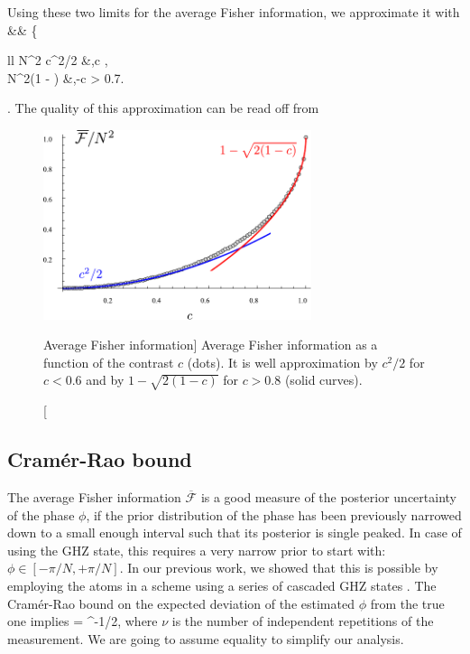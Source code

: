Using these two limits for the average Fisher information, we approximate it
with
\bal
\label{eq:overline_F}
	&\approx&
	\left\{
	\begin{array}{ll}
		N^2 c^2/2 &,\quad {}\quad c , \\
		N^2\left(1 - \right) &,\quad {}-c > 0.7.
	\end{array} 
	\right.
\eal
The quality of this approximation can be read off from 
\begin{figure}[h]
\centering
\includegraphics[width=0.7\textwidth]{./figs_Komar2015/Fisher_inf.pdf}
\caption
[Average Fisher information]
{
\label{fig:Fisher_inf}
Average Fisher information as a function of the contrast
$c$ (dots). It is well approximation by $c^2/2$ for $c < 0.6$ and by
$1-\sqrt{2(1-c)}$ for $c > 0.8$ (solid curves).} 
\end{figure}

\subsection{Cram\'{e}r-Rao bound}

The average Fisher information $\overline{\mathcal{F}}$ is a good measure of the
posterior uncertainty of the phase $\phi$, if the prior distribution of the
phase has been previously narrowed down to a small enough interval such that
its posterior is single peaked.
 In case of using the GHZ state, this requires a
very narrow prior to start with: $\phi \in [-\pi/N, +\pi/N]$. In our previous
work, we showed that this is possible by employing the atoms in a scheme using a
series of cascaded GHZ states \cite{Kessler2014}. The Cram\'{e}r-Rao bound on the
expected deviation of the estimated $\phi$ from the true one implies
\bel
	\Delta\phi = \geq  
	^{-1/2},
\eel
where $\nu$ is the number of independent repetitions of the measurement. We are
going to assume equality to simplify our analysis.


